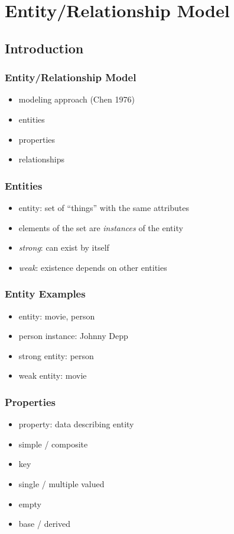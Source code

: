 \documentclass[dvipsnames]{beamer}
\begin{document}
\section{Entity/Relationship Model}

\subsection{Introduction}

\begin{frame}
  \frametitle{Entity/Relationship Model}

  \begin{itemize}
    \item modeling approach (Chen 1976)

    \medskip
    \item entities
    \item properties
    \item relationships
  \end{itemize}
\end{frame}

\begin{frame}
  \frametitle{Entities}

  \begin{itemize}
    \item \alert{entity}: set of ``things'' with the same attributes
    \item elements of the set are \emph{instances} of the entity

    \medskip
    \item \emph{strong}: can exist by itself
    \item \emph{weak}: existence depends on other entities
  \end{itemize}
\end{frame}

\begin{frame}
  \frametitle{Entity Examples}

  \begin{itemize}
    \item entity: movie, person
    \item person instance: Johnny Depp

    \pause
    \medskip
    \item strong entity: person
    \item weak entity: movie
  \end{itemize}
\end{frame}

\begin{frame}
  \frametitle{Properties}

  \begin{itemize}
    \item \alert{property}: data describing entity

    \medskip
    \item simple / composite
    \item key
    \item single / multiple valued
    \item empty
    \item base / derived
  \end{itemize}
\end{frame}
\end{document}
